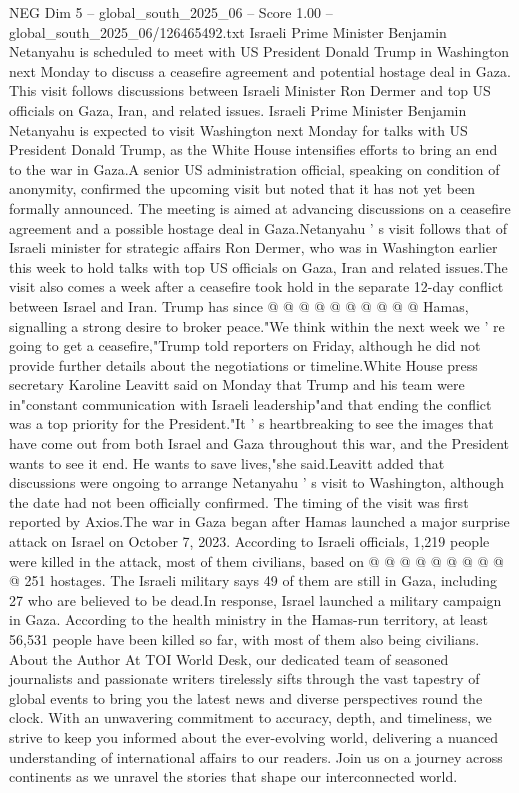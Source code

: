 \begin{textsample}{NEG Dim 5 – global\_south\_2025\_06 – Score 1.00 – global\_south\_2025\_06/126465492.txt}  \label{ex:f5_neg_391}
Israeli Prime Minister Benjamin Netanyahu is scheduled to meet with US President Donald Trump in Washington next Monday to discuss a ceasefire agreement and potential hostage deal in Gaza.
This visit follows discussions between Israeli Minister Ron Dermer and top US officials on Gaza, Iran, and related issues.
Israeli Prime Minister Benjamin Netanyahu is expected to visit Washington next Monday for talks with US President Donald Trump, as the White House intensifies efforts to bring an end to the war in Gaza.A senior US administration official, speaking on condition of anonymity, confirmed the upcoming visit but noted that it has not yet been formally announced.
The meeting is aimed at advancing discussions on a ceasefire agreement and a possible hostage deal in Gaza.Netanyahu ' s visit follows that of Israeli minister for strategic affairs Ron Dermer, who was in Washington earlier this week to hold talks with top US officials on Gaza, Iran and related issues.The visit also comes a week after a ceasefire took hold in the separate 12-day conflict between Israel and Iran.
Trump has since @ @ @ @ @ @ @ @ @ @ Hamas, signalling a strong desire to broker peace."We think within the next week we ' re going to get a ceasefire,"Trump told reporters on Friday, although he did not provide further details about the negotiations or timeline.White House press secretary Karoline Leavitt said on Monday that Trump and his team were in"constant communication with Israeli leadership"and that ending the conflict was a top priority for the President."It ' s heartbreaking to see the images that have come out from both Israel and Gaza throughout this war, and the President wants to see it end.
He wants to save lives,"she said.Leavitt added that discussions were ongoing to arrange Netanyahu ' s visit to Washington, although the date had not been officially confirmed.
The timing of the visit was first reported by Axios.The war in Gaza began after Hamas launched a major surprise attack on Israel on October 7, 2023.
According to Israeli officials, 1,219 people were killed in the attack, most of them civilians, based on @ @ @ @ @ @ @ @ @ @ 251 hostages.
The Israeli military says 49 of them are still in Gaza, including 27 who are believed to be dead.In response, Israel launched a military campaign in Gaza.
According to the health ministry in the Hamas-run territory, at least 56,531 people have been killed so far, with most of them also being civilians.
About the Author At TOI World Desk, our dedicated team of seasoned journalists and passionate writers tirelessly sifts through the vast tapestry of global events to bring you the latest news and diverse perspectives round the clock.
With an unwavering commitment to accuracy, depth, and timeliness, we strive to keep you informed about the ever-evolving world, delivering a nuanced understanding of international affairs to our readers.
Join us on a journey across continents as we unravel the stories that shape our interconnected world.

\end{textsample}
